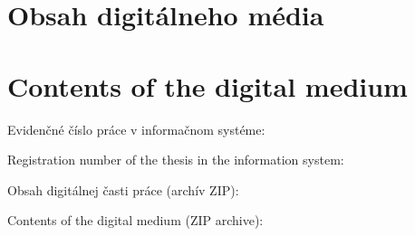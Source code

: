 \thispagestyle{empty}

\ifx\FIITlagEN\undefined
	\chapter{Obsah digitálneho média}
\else
	\chapter{Contents of the digital medium}
\fi

\renewcommand*{\thepage}{B-\arabic{page}}

\ifx\FIITlagEN\undefined
	\par Evidenčné číslo práce v informačnom systéme: \FIITevidenceNumber
\else
	\par Registration number of the thesis in the information system: \FIITevidenceNumber
\fi

\ifx\FIITlagEN\undefined
	\par Obsah digitálnej časti práce (archív ZIP):
\else
	\par Contents of the digital medium (ZIP archive):
\fi

